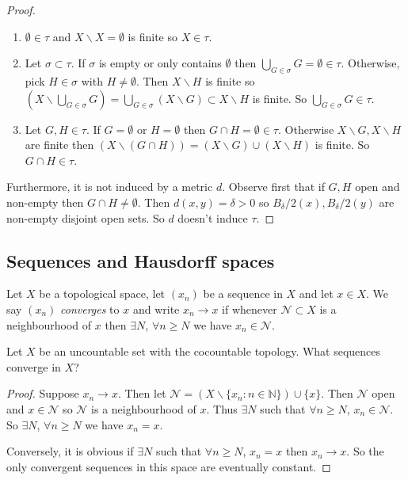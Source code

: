 \begin{proof}
\begin{enumerate}
    \item $\emptyset\in\tau$ and $X\backslash X = \emptyset$ is finite so $X\in\tau$.
    \item Let $\sigma \subset\tau$. If $\sigma$ is empty or only contains $\emptyset$ then $\bigcup_{G\in \sigma} G = \emptyset\in \tau$. 
    Otherwise, pick $H\in \sigma$ with $H\neq \emptyset$. Then $X\backslash H$ is finite so $(X\backslash\bigcup_{G\in \sigma} G) = \bigcup_{G\in \sigma} (X\backslash G)\subset X\backslash H$ is finite. So $\bigcup_{G\in \sigma} G \in \tau.$
    \item Let $G,H\in \tau$. If $G = \emptyset$ or $H=\emptyset$ then $G\cap H = \emptyset\in\tau$. Otherwise $X\backslash G, X\backslash H$ are finite then $(X\backslash(G\cap H)) = (X\backslash G)\cup(X\backslash H)$ is finite. So $G\cap H\in \tau$.
\end{enumerate}

Furthermore, it is not induced by a metric $d$. Observe first that if $G,H$ open and non-empty then $G\cap H\neq \emptyset$. Then $d(x,y) = \delta > 0$ so $B_\delta/2(x), B_\delta/2(y)$ are non-empty disjoint open sets. So $d$ doesn't induce $\tau$.
\end{proof}

\subsection{Sequences and Hausdorff spaces}

\begin{definition}
Let $X$ be a topological space, let $(x_n)$ be a sequence in $X$ and let $x\in X$. We say $(x_n)$ \emph{converges} to $x$ and write $x_n\rightarrow x$ if whenever $\mathcal{N}\subset X$ is a neighbourhood of $x$ then $\exists N$, $\forall n \geq N$ we have $x_n \in \mathcal{N}$.
\end{definition}

\begin{question}
Let $X$ be an uncountable set with the cocountable topology. What sequences converge in $X$?
\end{question}

\begin{proof}
Suppose $x_n\rightarrow x$. Then let $\mathcal{N} = (X\backslash \{x_n : n\in \mathbb{N}\})\cup\{x\}$. Then $\mathcal{N}$ open and $x\in \mathcal{N}$ so $\mathcal{N}$ is a neighbourhood of $x$. Thus $\exists N$ such that $\forall n\ge N$, $x_n\in \mathcal{N}$. So $\exists N$, $\forall n\ge N$ we have $x_n=x$.

Conversely, it is obvious if $\exists N$ such that $\forall n\ge N$, $x_n=x$ then $x_n\rightarrow x$. So the only convergent sequences in this space are eventually constant.
\end{proof}

